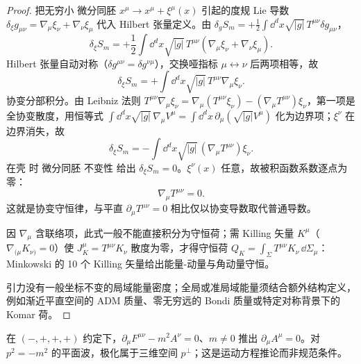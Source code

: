 \begin{proof}
把无穷小 微分同胚 $x^\mu\to x^\mu+\xi^\mu(x)$ 引起的度规 Lie 导数 $\delta_\xi g_{\mu\nu}=\nabla_\mu\xi_\nu+\nabla_\nu\xi_\mu$ 代入 Hilbert 张量定义。由 $\delta_g S_m=+\frac12\int\dd^dx\sqrt{|g|}\,T^{\mu\nu}\delta g_{\mu\nu}$，
\begin{equation*}
\delta_\xi S_m=+\frac12\int\dd^dx\sqrt{|g|}\,T^{\mu\nu}(\nabla_\mu\xi_\nu+\nabla_\nu\xi_\mu).
\end{equation*}
Hilbert 张量自动对称（$\delta g^{\mu\nu}=\delta g^{\nu\mu}$），交换哑指标 $\mu\leftrightarrow\nu$ 后两项相等，故
\begin{equation*}
\delta_\xi S_m=+\int\dd^dx\sqrt{|g|}\,T^{\mu\nu}\nabla_\mu\xi_\nu.
\end{equation*}
协变分部积分。由 Leibniz 法则 $T^{\mu\nu}\nabla_\mu\xi_\nu=\nabla_\mu(T^{\mu\nu}\xi_\nu)-(\nabla_\mu T^{\mu\nu})\xi_\nu$，第一项是全协变散度，用恒等式 $\int\dd^dx\sqrt{|g|}\,\nabla_\mu V^\mu=\int\dd^dx\,\partial_\mu(\sqrt{|g|}V^\mu)$ 化为边界项；$\xi^\nu$ 在边界消失，故
\begin{equation*}
\delta_\xi S_m=-\int\dd^dx\sqrt{|g|}\,(\nabla_\mu T^{\mu\nu})\xi_\nu.
\end{equation*}
在壳 时 微分同胚 不变性 给出 $\delta_\xi S_m=0$。$\xi^\nu(x)$ 任意，故被积函数系数逐点为零：
\begin{equation}\label{eq:ms-curved-T-conservation}
\boxed{\nabla_\mu T^{\mu\nu}=0.}
\end{equation}
这就是协变守恒律，与平直 $\partial_\mu T^{\mu\nu}=0$ 相比仅以协变导数取代普通导数。

因 $\nabla_\mu$ 含联络项，此式一般不能直接积分为守恒荷；需 Killing 矢量 $K^\mu$（$\nabla_{(\mu}K_{\nu)}=0$）使 $J_K^\mu=T^{\mu\nu}K_\nu$ 散度为零，才得守恒荷 $Q_K=\int_\Sigma T^{\mu\nu}K_\nu\,\dd\Sigma_\mu$：Minkowski 的 10 个 Killing 矢量给出能量-动量与角动量守恒。

引力没有一般坐标不变的局域能量密度；全局或准局域能量须结合额外结构定义，例如渐近平直空间的 ADM 质量、零无穷远的 Bondi 质量或特定对称背景下的 Komar 荷。
\end{proof}

\begin{proposition}
在 $(-,+,+,+)$ 约定下，$\partial_\mu F^{\mu\nu}-m^2A^\nu=0$、$m\ne0$ 推出 $\partial_\mu A^\mu=0$。对 $p^2=-m^2$ 的平面波，极化属于三维空间 $p^\perp$；这是运动方程推论而非规范条件。
\end{proposition}

